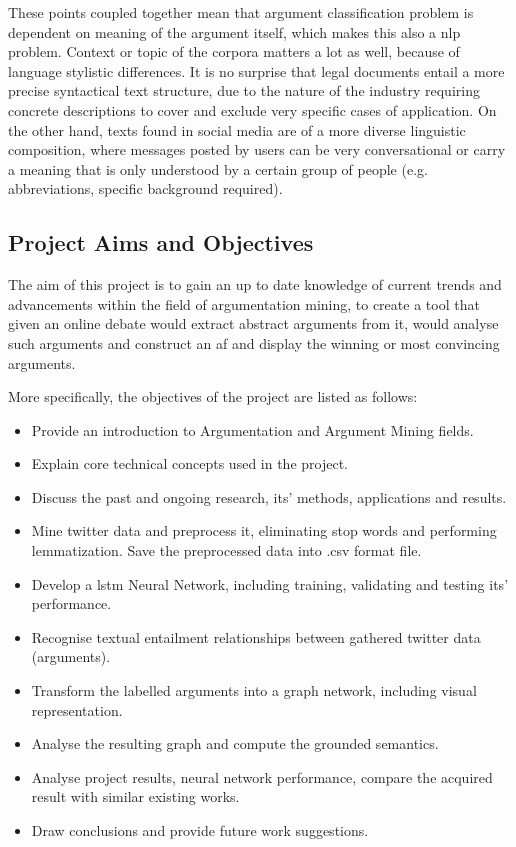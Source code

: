      These points coupled together mean that argument classification problem is dependent on meaning of the argument itself, which makes this also a \gls{nlp} problem. Context or topic of the corpora matters a lot as well, because of language stylistic differences. It is no surprise that legal documents entail a more precise syntactical text structure, due to the nature of the industry requiring concrete descriptions to cover and exclude very specific cases of application. On the other hand, texts found in social media are of a more diverse linguistic composition, where messages posted by users can be very conversational or carry a meaning that is only understood by a certain group of people (e.g. abbreviations, specific background required).
    
    \subsection{Project Aims and Objectives} 
     The aim of this project is to gain an up to date knowledge of current trends and advancements within the field of argumentation mining, to create a tool that given an online debate would extract abstract arguments from it, would analyse such arguments and construct an \gls{af} and display the winning or most convincing arguments.
    
     More specifically, the objectives of the project are listed as follows:
        \begin{itemize}
            \item Provide an introduction to Argumentation and Argument Mining fields.
            \item Explain core technical concepts used in the project.
            \item Discuss the past and ongoing research, its' methods, applications and results.
            \item Mine twitter data and preprocess it, eliminating stop words and performing lemmatization. Save the preprocessed data into .csv format file.
            \item Develop a \gls{lstm} Neural Network, including training, validating and testing its' performance.
            \item Recognise textual entailment relationships between gathered twitter data (arguments).
            \item Transform the labelled arguments into a graph network, including visual representation.
            \item Analyse the resulting graph and compute the grounded semantics.
            \item Analyse project results, neural network performance, compare the acquired result with similar existing works.
            \item Draw conclusions and provide future work suggestions.
        \end{itemize}